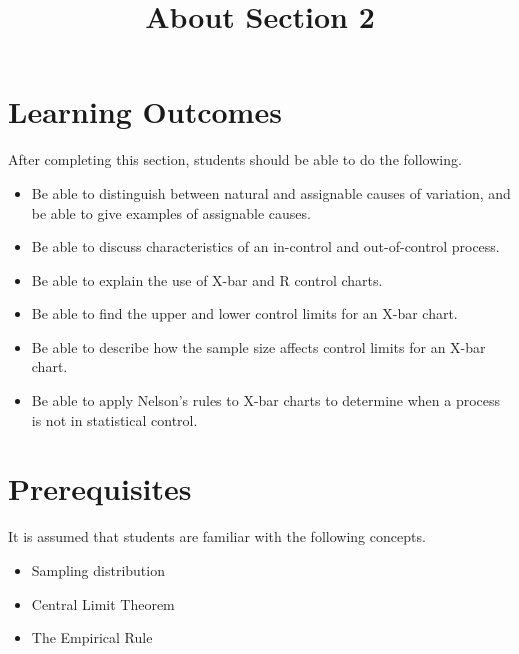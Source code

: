 \documentclass{ximera}
\title{About Section 2}
\begin{document}
\begin{abstract}
\end{abstract}
 
\maketitle
 
\section*{Learning Outcomes}
After completing this section, students should be able to do the following.
 
\begin{itemize}
\item Be able to distinguish between natural and assignable causes of variation, and be able to give examples of assignable causes.
\item Be able to discuss characteristics of an in-control and out-of-control process.
    \item Be able to explain the use of X-bar and R control charts.
    \item Be able to find the upper and lower control limits for an X-bar chart.
    \item Be able to describe how the sample size affects control limits for an X-bar chart.
    \item Be able to apply Nelson's rules to X-bar charts to determine when a process is not in statistical control.
    
   \end{itemize}

   \section*{Prerequisites}
   It is assumed that students are familiar with the following concepts.
   \begin{itemize}
   \item Sampling distribution
       \item Central Limit Theorem
        \item The Empirical Rule
   \end{itemize}
 
\end{document}
